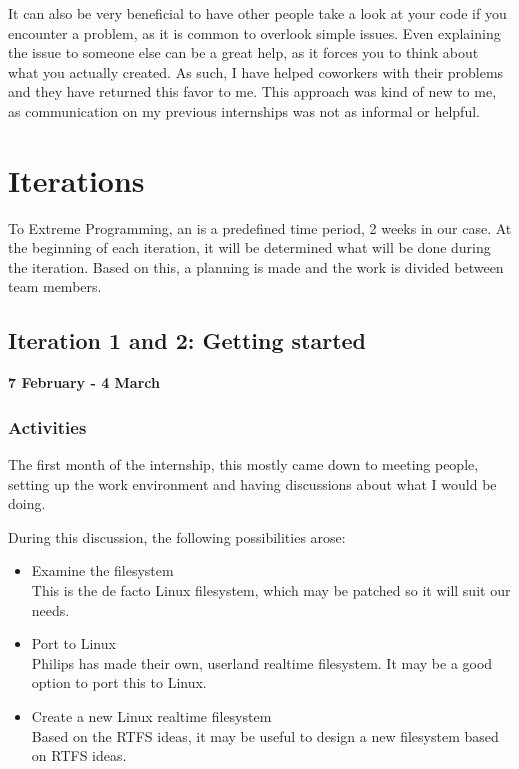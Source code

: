 It can also be very beneficial to have other people take a look at your code if you encounter a problem, as it is common to overlook simple issues. Even explaining the issue to someone else can be a great help, as it forces you to think about what you actually created. As such, I have helped coworkers with their problems and they have returned this favor to me. This approach was kind of new to me, as communication on my previous internships was not as informal or helpful.

\section{Iterations}

To Extreme Programming, an  is a predefined time period, 2 weeks in our case. At the beginning of each iteration, it will be determined what will be done during the iteration. Based on this, a planning is made and the work is divided between team members.

\subsection{Iteration 1 and 2: Getting started}
\label{startup}

\textbf{7 February - 4 March}

\subsubsection{Activities}

The first month of the internship, this mostly came down to meeting people, setting up the work environment and having discussions about what I would be doing.

During this discussion, the following possibilities arose:

\begin{itemize}
\item Examine the  filesystem \\
This is the de facto Linux filesystem, which may be patched so it will suit our needs.
\item Port  to Linux \\
Philips has made their own, userland realtime filesystem. It may be a good option to port this to Linux.
\item Create a new Linux realtime filesystem \\
Based on the RTFS ideas, it may be useful to design a new filesystem based on RTFS ideas.
\end{itemize}

